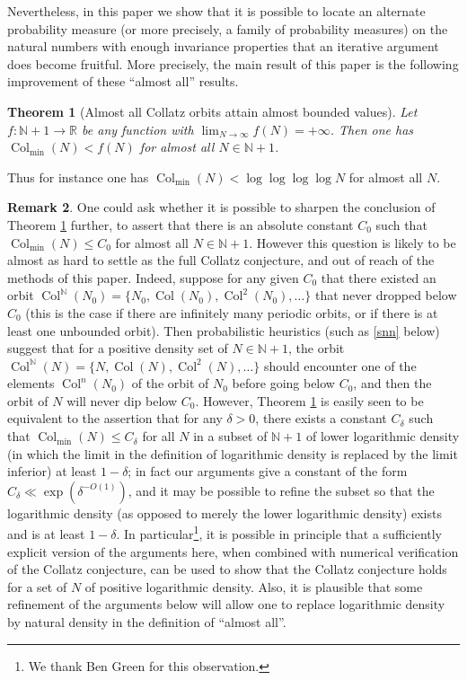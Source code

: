 \documentclass[12pt,a4paper,reqno]{amsart}
\numberwithin{equation}{section}
\theoremstyle{plain}
\newtheorem{theorem}{Theorem}[section]
\theoremstyle{definition}
\newtheorem{remark}[theorem]{Remark}
\newcommand\R{\mathbb{R}}
\newcommand\N{\mathbb{N}}
\newcommand\Col{{\operatorname{Col}}}
\begin{document}
Nevertheless, in this paper we show that it is possible to locate an alternate probability measure (or more precisely, a family of probability measures) on the natural numbers with enough invariance properties that an iterative argument does become fruitful.  More precisely, the main result of this paper is the following improvement of these ``almost all'' results.

\begin{theorem}[Almost all Collatz orbits attain almost bounded values]\label{main}  Let $f \colon \N + 1 \to \R$ be any function with $\lim_{N \to\infty} f(N) = +\infty$.  Then one has $\Col_{\min}(N) < f(N)$ for almost all $N \in \N+1$.
\end{theorem}

Thus for instance one has $\Col_{\min}(N) < \log\log\log\log N$ for almost all $N$.  


\begin{remark}  One could ask whether it is possible to sharpen the conclusion of Theorem \ref{main} further, to assert that there is an absolute constant $C_0$ such that $\Col_{\min}(N) \leq C_0$ for almost all $N \in \N+1$.  However this question is likely to be almost as hard to settle as the full Collatz conjecture, and out of reach of the methods of this paper.  Indeed, suppose for any given $C_0$ that there existed an orbit $\Col^\N(N_0) = \{N_0, \Col(N_0), \Col^2(N_0),\dots\}$ that never dropped below $C_0$ (this is the case if there are infinitely many periodic orbits, or if there is at least one unbounded orbit).  Then probabilistic heuristics (such as \eqref{snn} below) suggest that for a positive density set of $N \in \N+1$, the orbit $\Col^\N(N) = \{N, \Col(N), \Col^2(N), \dots\}$ should encounter one of the elements $\Col^n(N_0)$ of the orbit of $N_0$ before going below $C_0$, and then the orbit of $N$ will never dip below $C_0$.  However, Theorem \ref{main} is easily seen to be equivalent to the assertion that for any $\delta>0$, there exists a constant $C_\delta$ such that $\Col_{\min}(N) \leq C_\delta$ for all $N$ in a subset of $\N+1$ of lower logarithmic density (in which the limit in the definition of logarithmic density is replaced by the limit inferior) at least $1-\delta$; in fact our arguments give a constant of the form $C_\delta \ll \exp(\delta^{-O(1)})$, and it may be possible to refine the subset so that the logarithmic density (as opposed to merely the lower logarithmic density) exists and is at least $1-\delta$.  In particular\footnote{We thank Ben Green for this observation.}, it is possible in principle that a sufficiently explicit version of the arguments here, when combined with numerical verification of the Collatz conjecture, can be used to show that the Collatz conjecture holds for a set of $N$ of positive logarithmic density.  Also, it is plausible that some refinement of the arguments below will allow one to replace logarithmic density by natural density in the definition of ``almost all''.
\end{remark}
\end{document}
